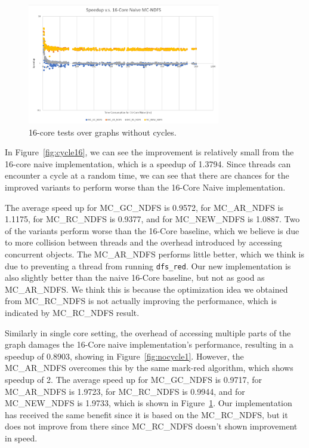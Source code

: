 \documentclass[a4paper]{article}
\begin{document}
\begin{figure}
\centering
\includegraphics[width=0.75\textwidth]{nocycle16.PNG}
\caption{\label{fig:nocycle16}16-core tests over graphs without cycles.}
\end{figure}

In Figure~\ref{fig:cycle16}, we can see the improvement is relatively small from the 16-core naive implementation, which is a speedup of 1.3794. Since threads can encounter a cycle at a random time, we can see that there are chances for the improved variants to perform worse than the 16-Core Naive implementation.

The average speed up for MC\_GC\_NDFS is 0.9572, for MC\_AR\_NDFS is 1.1175, for MC\_RC\_NDFS is 0.9377, and for MC\_NEW\_NDFS is 1.0887. Two of the variants perform worse than the 16-Core baseline, which we believe is due to more collision between threads and the overhead introduced by accessing concurrent objects. The MC\_AR\_NDFS performs little better, which we think is due to preventing a thread from running \texttt{dfs\_red}. Our new implementation is also slightly better than the naive 16-Core baseline, but not as good as MC\_AR\_NDFS. 
We think this is because the optimization idea we obtained from MC\_RC\_NDFS is not
actually improving the performance, which is indicated by MC\_RC\_NDFS result.

Similarly in single core setting, the overhead of accessing multiple parts of the graph damages the 16-Core naive implementation's performance, resulting in a speedup of 0.8903, showing in Figure~\ref{fig:nocycle1}. However, the MC\_AR\_NDFS overcomes this by the same mark-red algorithm, which shows speedup of 2. The average speed up for MC\_GC\_NDFS is 0.9717, for MC\_AR\_NDFS is 1.9723, for MC\_RC\_NDFS is 0.9944, and for MC\_NEW\_NDFS is 1.9733, which is shown in Figure~\ref{fig:nocycle16}. Our implementation has received the same benefit since it is based on the MC\_RC\_NDFS, but it does not improve from there since MC\_RC\_NDFS doesn't shown improvement in speed.
\end{document}
